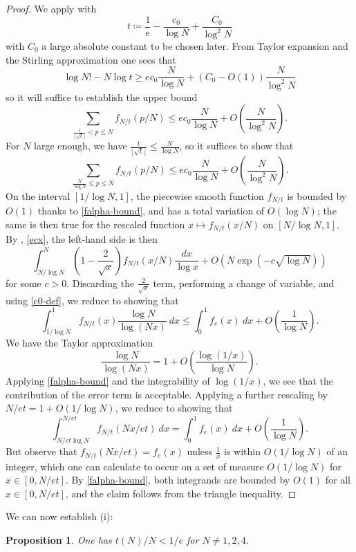 \documentclass[12pt,a4paper,reqno]{amsart}
\numberwithin{equation}{section}
\theoremstyle{plain}
\newtheorem{proposition}[theorem]{Proposition}
\theoremstyle{definition}
\begin{document}
    \begin{proof}  We apply  with
      $$ t \coloneqq \frac{1}{e} - \frac{c_0}{\log N} + \frac{C_0}{\log^2 N}$$
    with $C_0$ a large absolute constant to be chosen later.  From Taylor expansion and the Stirling approximation one sees that
    $$ \log N! - N \log t \geq ec_0 \frac{N}{\log N} + (C_0-O(1)) \frac{N}{\log^2 N}$$
    so it will suffice to establish the upper bound
    $$ \sum_{\frac{t}{\lfloor\sqrt{t}\rfloor} < p \leq N} f_{N/t}(p/N) \leq ec_0 \frac{N}{\log N} + O\left( \frac{N}{\log^2 N} \right).$$
    For $N$ large enough, we have $\frac{t}{\lfloor\sqrt{t}\rfloor} \leq \frac{N}{\log N}$, so it suffices to show that
    $$ \sum_{\frac{N}{\log N} \leq p \leq N} f_{N/t}(p/N) \leq ec_0 \frac{N}{\log N} + O\left( \frac{N}{\log^2 N} \right).$$
    On the interval $[1/\log N,1]$, the piecewise smooth function $f_{N/t}$ is bounded by $O(1)$ thanks to \eqref{falpha-bound}, and has a total variation of $O(\log N)$; the same is then true for the rescaled function $x \mapsto f_{N/t}(x/N)$ on $[N/\log N,1]$.  By , \eqref{ecx}, the left-hand side is then
    $$ \int_{N/\log N}^N \left(1-\frac{2}{\sqrt{x}}\right) f_{N/t}(x/N) \frac{dx}{\log x} + O\left( N \exp(-c\sqrt{\log N}) \right)$$
    for some $c>0$.  Discarding the $\frac{2}{\sqrt{x}}$ term, performing a change of variable, and using \eqref{c0-def}, we reduce to showing that
    $$  \int_{1/\log N}^1 f_{N/t}(x) \frac{\log N}{\log(Nx)}\ dx 
    \leq  \int_0^1 f_e(x)\ dx  + O\left( \frac{1}{\log N} \right).$$
    We have the Taylor approximation 
    $$\frac{\log N}{\log(Nx)} = 1 + O\left( \frac{\log(1/x)}{\log N} \right).$$ 
    Applying \eqref{falpha-bound} and the integrability of $\log(1/x)$, we see that the contribution of the error term is acceptable.  Applying a further rescaling by $N/et = 1 + O(1/\log N)$, we reduce to showing that
$$ \int_{N/et\log N}^{N/et} f_{N/t}(Nx/et)\ dx = \int_0^1 f_e(x)\ dx  + O\left( \frac{1}{\log N} \right).$$
But observe that $f_{N/t}(Nx/et) = f_e(x)$ unless $\frac{1}{x}$ is within $O(1/\log N)$ of an integer, which one can calculate to occur on a set of measure $O(1/\log N)$ for $x \in [0,N/et]$.  By \eqref{falpha-bound}, both integrands are bounded by $O(1)$ for all $x \in [0,N/et]$, and the claim follows from the triangle inequality.
\end{proof}
    
We can now establish (i): 

\begin{proposition}\label{tne} One has $t(N)/N < 1/e$ for $N \neq 1,2,4$.
\end{proposition}
\end{document}
